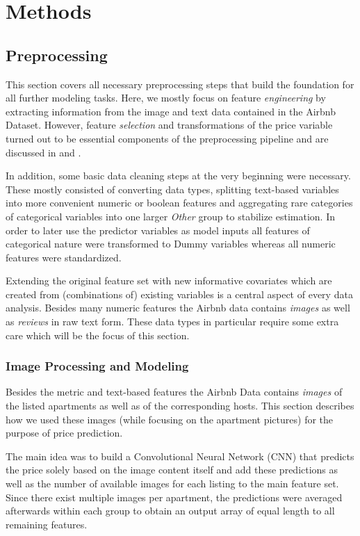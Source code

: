 \section{Methods}

\subsection{Preprocessing}

This section covers all necessary preprocessing steps that build the foundation for all further modeling tasks.
Here, we mostly focus on feature \emph{engineering} by extracting information from the image and text data contained in the Airbnb Dataset.
However, feature \emph{selection} and transformations of the price variable turned out to be essential components of the preprocessing pipeline and are discussed in  and .

In addition, some basic data cleaning steps at the very beginning were necessary.
These mostly consisted of converting data types, splitting text-based variables into more convenient numeric or boolean features and aggregating rare categories of categorical variables into one larger \emph{Other} group to stabilize estimation.
In order to later use the predictor variables as model inputs all features of categorical nature were transformed to Dummy variables whereas all numeric features were standardized.

Extending the original feature set with new informative covariates which are created from (combinations of) existing variables is a central aspect of every data analysis.
Besides many numeric features the Airbnb data contains \emph{images} as well as \emph{reviews} in raw text form.
These data types in particular require some extra care which will be the focus of this section.

\subsubsection{Image Processing and Modeling}

Besides the metric and text-based features the Airbnb Data contains \emph{images} of the listed apartments as well as of the corresponding hosts.
This section describes how we used these images (while focusing on the apartment pictures) for the purpose of price prediction.

The main idea was to build a Convolutional Neural Network (CNN) that predicts the price solely based on the image content itself and add these predictions as well as the number of available images for each listing to the main feature set.
Since there exist multiple images per apartment, the predictions were averaged afterwards within each group to obtain an output array of equal length to all remaining features.

